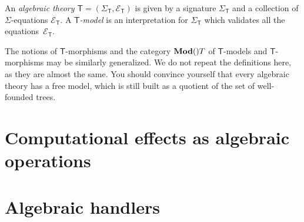 \documentclass{amsart}
\newcommand{\theory}[1]{\mathsf{#1}} %
\newcommand{\signature}[1]{\Sigma_{\theory{#1}}} %
\newcommand{\equations}[1]{\mathcal{E}_{\theory{#1}}} %
\newcommand{\Mod}[1]{\text{\textbf{Mod}}(\theory{#1})} %
\begin{document}
An \emph{algebraic theory $\theory{T} = (\signature{T}, \equations{T})$} is
given by a signature $\signature{T}$ and a collection of $\Sigma$-equations
$\equations{T}$. A \emph{$\theory{T}$-model} is an interpretation for
$\signature{T}$ which validates all the equations~$\equations{T}$.

The notions of $\theory{T}$-morphisms and the category $\Mod{}{T}$ of
$\theory{T}$-models and $\theory{T}$-morphisms may be similarly generalized. We
do not repeat the definitions here, as they are almost the same. You should
convince yourself that every algebraic theory has a free model, which is still
built as a quotient of the set of well-founded trees.

\section{Computational effects as algebraic operations}
\label{sec:comp-effects-as}

\section{Algebraic handlers}
\label{sec:algebraic-handlers}
\end{document}
